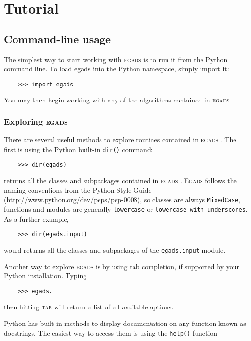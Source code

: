 \documentclass[a4paper,11pt]{report}
\newcommand{\egads}{\textsc{egads} }
\newcommand{\Egads}{\textsc{Egads} }
\begin{document}
\chapter{Tutorial}

\section{Command-line usage}
The simplest way to start working with \egads is to run it from the Python command line. To load egads into the Python namespace, simply import it:

\begin{verbatim}
    >>> import egads
\end{verbatim}
You may then begin working with any of the algorithms contained in \egads.

\subsection{Exploring \egads}
There are several useful methods to explore routines contained in \egads. The first is using the Python built-in \verb|dir()| command:

\begin{verbatim}
    >>> dir(egads)
\end{verbatim}
returns all the classes and subpackages contained in \egads. \Egads follows the naming conventions from the Python Style Guide (\href{http://www.python.org/dev/peps/pep-0008}{http://www.python.org/dev/peps/pep-0008}), so classes are always \verb|MixedCase|, functions and modules are generally \verb|lowercase| or \verb|lowercase_with_underscores|. As a further example,

\begin{verbatim}
    >>> dir(egads.input)
\end{verbatim}
would returns all the classes and subpackages of the \verb|egads.input| module.

Another way to explore \egads is by using tab completion, if supported by your Python installation. Typing 

\begin{verbatim}
    >>> egads.
\end{verbatim}
then hitting \textsc{tab} will return a list of all available options. 

Python has built-in methods to display documentation on any function known as docstrings. The easiest way to access them is using the \verb|help()| function:
\end{document}
